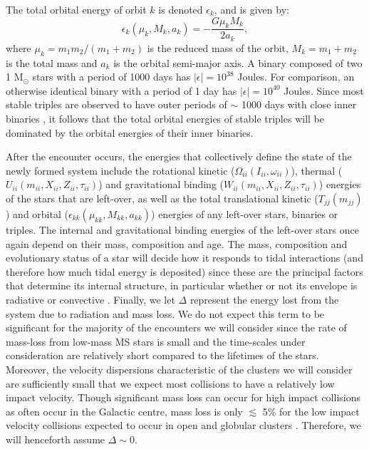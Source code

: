 The total orbital energy of orbit $k$ is denoted $\epsilon_k$, 
and is given by:
\begin{equation}
\label{eqn:orbital}
\epsilon_k(\mu_k,M_k,a_k) = -\frac{G{\mu_k}M_k}{2a_k},
\end{equation}
where $\mu_k = m_1m_2/(m_{1}+m_{2})$ is the reduced mass of the orbit, $M_k =
m_1+m_2$ is the total mass and $a_k$ is the orbital semi-major axis.  A
binary composed of two 1 M$_{\odot}$ stars with a period of 1000 days
has $|\epsilon| = 10^{38}$ Joules.  For comparison, an otherwise identical
binary with a period of 1 day has $|\epsilon| = 10^{40}$ Joules.  Since
most stable triples are observed to have outer periods of $\sim$ 1000
days with close inner binaries \citep{tokovinin97, perets09}, it follows
that the total orbital energies of stable triples will be dominated
by the orbital energies of their inner binaries.  

After the encounter occurs, the energies that collectively define the
state of the newly formed system include the rotational kinetic
($\Omega_{ii}(I_{ii},\omega_{ii})$), thermal
($U_{ii}(m_{ii},X_{ii},Z_{ii},\tau_{ii})$) and gravitational binding
($W_{ii}(m_{ii},X_{ii},Z_{ii},\tau_{ii})$) energies of the stars that
are left-over, as well as the total translational kinetic
($T_{jj}(m_{jj})$) and orbital
($\epsilon_{kk}(\mu_{kk},M_{kk},a_{kk})$) energies of any left-over
stars, binaries or triples.  The internal and gravitational binding 
energies of the left-over stars once again depend on their mass,
composition and age.  The mass, composition and evolutionary status of
a star will decide how it responds to tidal interactions (and
therefore how much tidal energy is deposited) since these are the
principal factors that determine its internal structure, in particular
whether or not its envelope is radiative or convective
\citep{podsiadlowski96}.  Finally, we let $\Delta$ represent the
energy lost from the system due to radiation and mass loss.  We do not
expect this term to be significant for the majority of the encounters
we will consider since the rate of mass-loss from low-mass MS stars is
small and the time-scales under consideration are
relatively short compared to the lifetimes of the stars.  Moreover,
the velocity dispersions characteristic of the clusters we will
consider are sufficiently small that we expect most
collisions to have a relatively low impact velocity.  Though
significant mass loss can occur for high impact collisions as often
occur in the Galactic centre, mass loss is only $\lesssim$ 5\% for the low
impact velocity collisions expected to occur in open and globular
clusters \citep{sills01}.  Therefore, we will henceforth assume
$\Delta \sim 0$.


